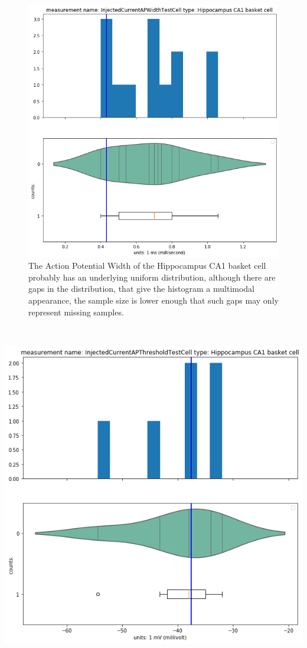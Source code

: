     \begin{center}
   \begin{figure} \includegraphics[width=0.7\linewidth]{notebooks_converted/needata_thesis_files/needata_thesis_5_9}
   \caption{The Action Potential Width of the Hippocampus CA1 basket cell probably has an underlying uniform distribution, although there are gaps in the distribution, that give the histogram a multimodal appearance, the sample size is lower enough that such gaps may only represent missing samples.}
\end{figure}
\end{center}
    { \hspace*{\fill} \\}
    
    \begin{center}
   \includegraphics[width=0.7\linewidth]{notebooks_converted/needata_thesis_files/needata_thesis_5_10}
    \end{center}
    { \hspace*{\fill} \\}
    
